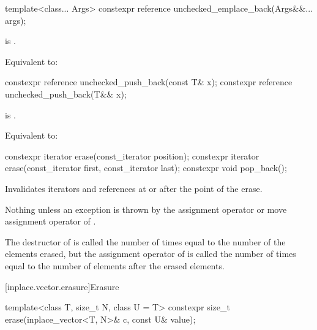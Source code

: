 %
\begin{itemdecl}
template<class... Args>
  constexpr reference unchecked_emplace_back(Args&&... args);
\end{itemdecl}

\begin{itemdescr}
\pnum
\expects
{} is .

\pnum
\effects
Equivalent to:
\end{itemdescr}

%
\begin{itemdecl}
constexpr reference unchecked_push_back(const T& x);
constexpr reference unchecked_push_back(T&& x);
\end{itemdecl}

\begin{itemdescr}
\pnum
\expects
{} is .

\pnum
\effects
Equivalent to:
\end{itemdescr}

%
%
\begin{itemdecl}
constexpr iterator erase(const_iterator position);
constexpr iterator erase(const_iterator first, const_iterator last);
constexpr void pop_back();
\end{itemdecl}

\begin{itemdescr}
\pnum
\effects
Invalidates iterators and references at or after the point of the erase.

\pnum
\throws
Nothing unless an exception is thrown by
the assignment operator or move assignment operator of .

\pnum
\complexity
The destructor of  is called the number of times
equal to the number of the elements erased, but
the assignment operator of  is called the number of times
equal to the number of elements after the erased elements.
\end{itemdescr}

[inplace.vector.erasure]{Erasure}

%
\begin{itemdecl}
template<class T, size_t N, class U = T>
  constexpr size_t erase(inplace_vector<T, N>& c, const U& value);
\end{itemdecl}

